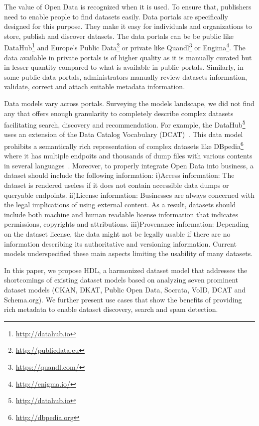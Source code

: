 \documentclass[runningheads,a4paper]{llncs}
\begin{document}
The value of Open Data is recognized when it is used. To ensure that, publishers need to enable people to find datasets easily. Data portals are specifically designed for this purpose. They make it easy for individuals and organizations to store, publish and discover datasets. The data portals can be be public like DataHub\footnote{\url{http://datahub.io}} and Europe's Public Data\footnote{\url{http://publicdata.eu}} or private like Quandl\footnote{\url{https://quandl.com/}} or Engima\footnote{\url{http://enigma.io/}}. The data available in private portals is of higher quality as it is manually curated but in lesser quantity compared to what is available in public portals. Similarly, in some public data portals, administrators manually review datasets information, validate, correct and attach suitable metadata information.

Data models vary across portals. Surveying the models landscape, we did not find any that offers enough granularity to completely describe complex datasets facilitating search, discovery and recommendation. For example, the DataHub\footnote{\url{http://datahub.io}} uses an extension of the Data Catalog Vocabulary (DCAT)~\cite{Erickson:14:DCV}. This data model prohibits a semantically rich representation of complex datasets like DBpedia\footnote{\url{http://dbpedia.org}} where it has multiple endpoits and thousands of dump files with various contents in several languages~\cite{Brummer:2014:DTS:2660517.2660538}. Moreover, to properly integrate Open Data into business, a dataset should include the following information: i)Access information: The dataset is rendered useless if it does not contain accessible data dumps or queryable endpoints. ii)License information: Businesses are always concerned with the legal implications of using external content. As a result, datasets should include both machine and human readable license information that indicates permissions, copyrights and attributions. iii)Provenance information: Depending on the dataset license, the data might not be legally usable if there are no information describing its authoritative and versioning information. Current models underspecified these main aspects limiting the usability of many datasets.

In this paper, we propose HDL, a harmonized dataset model that addresses the shortcomings of existing dataset models based on analyzing seven prominent dataset models (CKAN, DKAT, Public Open Data, Socrata, VoID, DCAT and Schema.org). We further present use cases that show the benefits of providing rich metadata to enable dataset discovery, search and spam detection.
\end{document}
